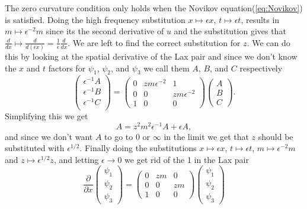 \documentclass[english,master]{liumaiex}
\theoremstyle{plain}
\theoremstyle{definition}
\begin{document}
%
The zero curvature condition only holds when the Novikov equation(\ref{eq:Novikov}) is satisfied.
Doing the high frequency substitution $x \mapsto \epsilon x$, $t \mapsto \epsilon t$, results in $m \mapsto \epsilon^{-2} m$ since its the second derivative of $u$ and the substitution gives that $\frac{d}{dx} \mapsto \frac{d}{d (\epsilon x)} = \frac{1}{\epsilon} \frac{d}{dx}$. We are left to find the correct substitution for $z$. We can do this by looking at the spatial derivative of the Lax pair and since we don't know the $x$ and $t$ factors for $\psi_1$, $\psi_2$, and $\psi_3$ we call them $A$, $B$, and $C$ respectively
\begin{equation}
\begin{pmatrix} 
	\epsilon^{-1} A \\
	\epsilon^{-1} B \\
	\epsilon^{-1} C \\
\end{pmatrix} =
\begin{pmatrix}
	0 & zm\epsilon^{-2} & 1 \\
	0 & 0 & zm\epsilon^{-2}  \\
	1 & 0 & 0
\end{pmatrix}
\begin{pmatrix} A \\ B \\ C \end{pmatrix} .
\end{equation}
Simplifying this we get
\begin{equation}
	A = z^2m^2\epsilon^{-1}A + \epsilon A,
\end{equation}
and since we don't want $A$ to go to $0$ or $\infty$ in the limit we get that $z$ should be substituted with $\epsilon^{1/2}$.
Finally doing the substitutions $x \mapsto \epsilon x$, $t \mapsto \epsilon t$, $m \mapsto \epsilon^{-2} m$ and $z \mapsto \epsilon^{1/2}z$, and letting $\epsilon \rightarrow 0$ we get rid of the 1 in the Lax pair
\begin{equation}
\frac{\partial}{\partial x}
\begin{pmatrix} \psi_1 \\ \psi_2 \\ \psi_3 \end{pmatrix} =
\begin{pmatrix}
	0 & zm & 0 \\
	0 & 0 & zm \\
	1 & 0 & 0
\end{pmatrix}
\begin{pmatrix} \psi_1 \\ \psi_2 \\ \psi_3 \end{pmatrix}
\end{equation}
\end{document}
